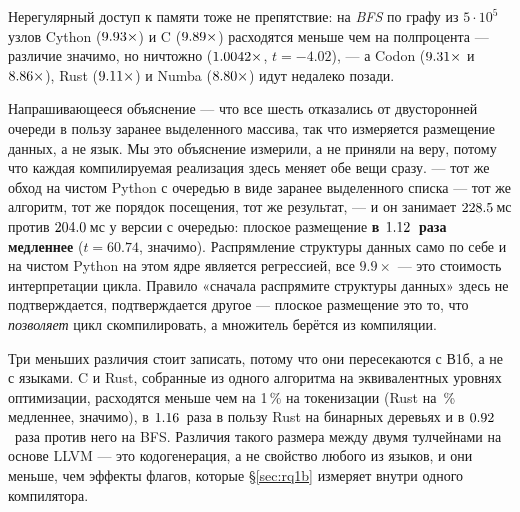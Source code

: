 Нерегулярный доступ к памяти тоже не препятствие: на \emph{BFS} по графу из $5\cdot10^5$ узлов
Cython ($\meas{ratio:b2_branchy-314:bfs/cpython_loop|b2_branchy-314:bfs/cython}{9.93}\times$) и C ($\meas{ratio:b2_branchy-314:bfs/cpython_loop|b2_branchy-314:bfs/c_ctypes}{9.89}\times$) расходятся меньше чем на полпроцента --- различие
значимо, но ничтожно ($\meas{ratio:b2_branchy-314:bfs/c_ctypes|b2_branchy-314:bfs/cython}{1.0042}\times$, $t=-4.02$), --- а Codon ($\meas{ratio:b2_branchy-314:bfs/cpython_loop|b2_branchy-314:bfs/codon_pyext}{9.31}\times$ и $\meas{ratio:b2_branchy-314:bfs/cpython_loop|b2_branchy-314:bfs/codon_jit}{8.86}\times$), Rust
($\meas{ratio:b2_branchy-314:bfs/cpython_loop|b2_branchy-314:bfs/rust_ctypes}{9.11}\times$) и Numba ($\meas{ratio:b2_branchy-314:bfs/cpython_loop|b2_branchy-314:bfs/numba}{8.80}\times$) идут недалеко позади.

Напрашивающееся объяснение --- что все шесть отказались от двусторонней очереди в пользу заранее
выделенного массива, так что измеряется размещение данных, а не язык. Мы это объяснение измерили, а
не приняли на веру, потому что каждая компилируемая реализация здесь меняет обе вещи сразу.
 --- тот же обход на чистом Python с очередью в виде заранее выделенного списка
--- тот же алгоритм, тот же порядок посещения, тот же результат, --- и он занимает $\meas{med:b2_branchy-314:bfs/cpython_flat:ms}{228.5}$\,мс
против $\meas{med:b2_branchy-314:bfs/cpython_loop:ms}{204.0}$\,мс у версии с очередью: плоское размещение \textbf{в $\meas{ratio:b2_branchy-314:bfs/cpython_flat|b2_branchy-314:bfs/cpython_loop}{1.12}$~раза медленнее}
($t=60.74$, значимо). Распрямление структуры данных само по себе и на чистом Python на этом ядре
является регрессией, все $9.9\times$ --- это стоимость интерпретации цикла. Правило «сначала
распрямите структуры данных» здесь не подтверждается, подтверждается другое --- плоское размещение
это то, что \emph{позволяет} цикл скомпилировать, а множитель берётся из компиляции.

Три меньших различия стоит записать, потому что они пересекаются с В1б, а не с языками. C и Rust,
собранные из одного алгоритма на эквивалентных уровнях оптимизации, расходятся меньше чем на 1\,\%
на токенизации (Rust на \,\% медленнее, значимо), в $\meas{ratio:b2_branchy-314:binarytrees/c_ctypes|b2_branchy-314:binarytrees/rust_ctypes}{1.16}$~раза в пользу Rust на бинарных
деревьях и в $\meas{ratio:b2_branchy-314:bfs/c_ctypes|b2_branchy-314:bfs/rust_ctypes}{0.92}$~раза против него на BFS. Различия такого размера между двумя тулчейнами на
основе LLVM --- это кодогенерация, а не свойство любого из языков, и они меньше, чем эффекты
флагов, которые \S\ref{sec:rq1b} измеряет внутри одного компилятора.

